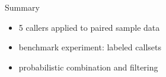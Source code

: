 \documentclass{beamer}
\begin{document}
\begin{frame}{Summary}
\begin{itemize}
\item 5 callers applied to paired sample data
\item benchmark experiment: labeled callsets
\item probabilistic combination and filtering
\end{itemize}
\end{frame}
\end{document}
